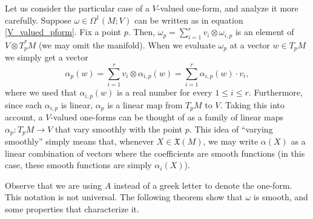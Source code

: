 \begin{obs} \label{obs_V_valued_1_form}
    Let us consider the particular case of a \(V\)-valued one-form, and analyze it more carefully. Suppose \(\omega \in \Omega^1(M;V)\) can be written as in equation \eqref{V_valued_pform}. Fix a point \(p\). Then, \(\omega_p=\sum_{i=1}^r v_i \otimes \omega_{i,p}\) is an element of \(V \otimes T^*_pM\) (we may omit the manifold). When we evaluate \(\omega_p\) at a vector \(w\in T_pM\) we simply get a vector
    \[
    \alpha_p(w)=\sum_{i=1}^r v_i \otimes \alpha_{i,p}(w)=\sum_{i=1}^r \alpha_{i,p}(w) \cdot  v_i,
    \]
    where we used that \(\alpha_{i,p}(w)\) is a real number for every \(1 \leq i \leq r\). Furthermore, since each \(\alpha_{i,p}\) is linear, \(\alpha_p\) is a linear map from \(T_pM\) to \(V\). Taking this into account, a \(V\)-valued one-forms can be thought of as a family of linear maps \(\alpha_p\colon T_pM \to V\) that vary smoothly with the point \(p\). This idea of ``varying smoothly'' simply means that, whenever \(X\in \mathfrak{X}(M)\), we may write \(\alpha(X)\) as a linear combination of vectors where the coefficients are smooth functions (in this case, these smooth functions are simply \(\alpha_i(X)\)).
\end{obs}


Observe that we are using \(A\) instead of a greek letter to denote the one-form. This notation is not universal. The following theorem show that \(\omega\) is smooth, and some properties that characterize it.

